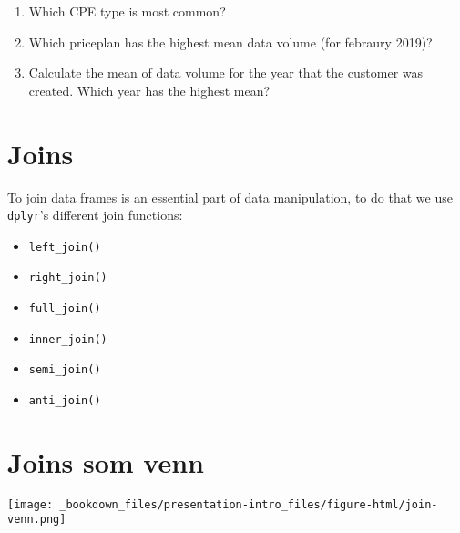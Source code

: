 \documentclass[]{book}
\newenvironment{Shaded}{\begin{snugshade}}{\end{snugshade}}
\newcommand{\DataTypeTok}[1]{\textcolor[rgb]{0.13,0.29,0.53}{#1}}
\newcommand{\KeywordTok}[1]{\textcolor[rgb]{0.13,0.29,0.53}{\textbf{#1}}}
\newcommand{\NormalTok}[1]{#1}
\newcommand{\OperatorTok}[1]{\textcolor[rgb]{0.81,0.36,0.00}{\textbf{#1}}}
\newcommand{\StringTok}[1]{\textcolor[rgb]{0.31,0.60,0.02}{#1}}
\providecommand{\tightlist}{%
  \setlength{\itemsep}{0pt}\setlength{\parskip}{0pt}}
\begin{document}
\begin{enumerate}
\def\labelenumi{\arabic{enumi}.}
\item
  Which CPE type is most common?
\item
  Which priceplan has the highest mean data volume (for febraury 2019)?
\item
  Calculate the mean of data volume for the year that the customer was created. Which year has the highest mean?
\end{enumerate}

\hypertarget{joins}{%
\section{Joins}\label{joins}}

To join data frames is an essential part of data manipulation, to do that we use \texttt{dplyr}'s different join functions:

\begin{itemize}
\tightlist
\item
  \texttt{left\_join()}
\item
  \texttt{right\_join()}
\item
  \texttt{full\_join()}
\item
  \texttt{inner\_join()}
\item
  \texttt{semi\_join()}
\item
  \texttt{anti\_join()}
\end{itemize}

\hypertarget{joins-som-venn}{%
\section{Joins som venn}\label{joins-som-venn}}

\texttt{[image: \_bookdown\_files/presentation-intro\_files/figure-html/join-venn.png]}

\begin{Shaded}
\end{Shaded}
\end{document}
